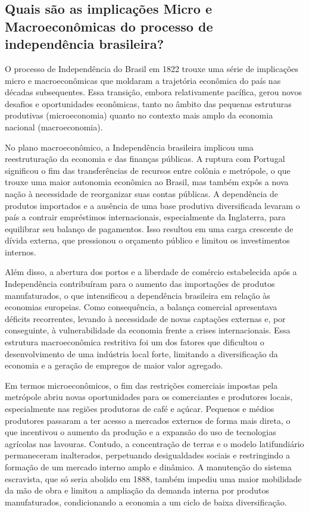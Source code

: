 \documentclass[a4paper,12pt]{article}[abntex2]
\begin{document}
\subsection{\textbf{Quais são as implicações Micro e Macroeconômicas do processo de independência brasileira?}}

O processo de Independência do Brasil em 1822 trouxe uma série de implicações micro e macroeconômicas que moldaram a trajetória econômica do país nas décadas subsequentes. Essa transição, embora relativamente pacífica, gerou novos desafios e oportunidades econômicas, tanto no âmbito das pequenas estruturas produtivas (microeconomia) quanto no contexto mais amplo da economia nacional (macroeconomia).

No plano macroeconômico, a Independência brasileira implicou uma reestruturação da economia e das finanças públicas. A ruptura com Portugal significou o fim das transferências de recursos entre colônia e metrópole, o que trouxe uma maior autonomia econômica ao Brasil, mas também expôs a nova nação à necessidade de reorganizar suas contas públicas. A dependência de produtos importados e a ausência de uma base produtiva diversificada levaram o país a contrair empréstimos internacionais, especialmente da Inglaterra, para equilibrar seu balanço de pagamentos. Isso resultou em uma carga crescente de dívida externa, que pressionou o orçamento público e limitou os investimentos internos.

Além disso, a abertura dos portos e a liberdade de comércio estabelecida após a Independência contribuíram para o aumento das importações de produtos manufaturados, o que intensificou a dependência brasileira em relação às economias europeias. Como consequência, a balança comercial apresentava déficits recorrentes, levando à necessidade de novas captações externas e, por conseguinte, à vulnerabilidade da economia frente a crises internacionais. Essa estrutura macroeconômica restritiva foi um dos fatores que dificultou o desenvolvimento de uma indústria local forte, limitando a diversificação da economia e a geração de empregos de maior valor agregado.

Em termos microeconômicos, o fim das restrições comerciais impostas pela metrópole abriu novas oportunidades para os comerciantes e produtores locais, especialmente nas regiões produtoras de café e açúcar. Pequenos e médios produtores passaram a ter acesso a mercados externos de forma mais direta, o que incentivou o aumento da produção e a expansão do uso de tecnologias agrícolas nas lavouras. Contudo, a concentração de terras e o modelo latifundiário permaneceram inalterados, perpetuando desigualdades sociais e restringindo a formação de um mercado interno amplo e dinâmico. A manutenção do sistema escravista, que só seria abolido em 1888, também impediu uma maior mobilidade da mão de obra e limitou a ampliação da demanda interna por produtos manufaturados, condicionando a economia a um ciclo de baixa diversificação.
\end{document}
